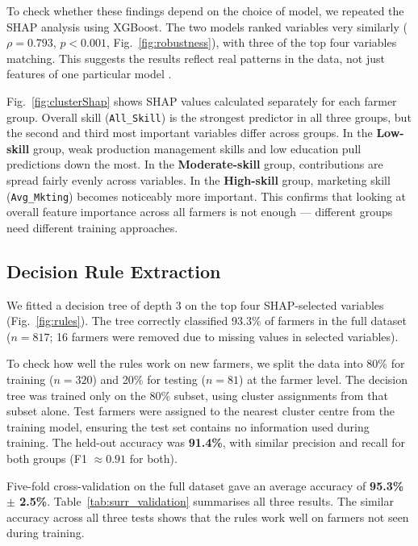 \documentclass[fleqn,10pt,lineno]{wlpeerj}
\begin{document}
To check whether these findings depend on the choice of model, we 
repeated the SHAP analysis using XGBoost. The two models ranked 
variables very similarly ($\rho = 0.793$, $p < 0.001$, 
Fig.~\ref{fig:robustness}), with three of the top four variables 
matching. This suggests the results reflect real patterns in the 
data, not just features of one particular model \citep{lundberg2020}.

Fig.~\ref{fig:clusterShap} shows SHAP values calculated separately 
for each farmer group. Overall skill (\texttt{All\_Skill}) is the 
strongest predictor in all three groups, but the second and third 
most important variables differ across groups. In the 
\textbf{Low-skill} group, weak production management skills and 
low education pull predictions down the most. In the 
\textbf{Moderate-skill} group, contributions are spread fairly 
evenly across variables. In the \textbf{High-skill} group, 
marketing skill (\texttt{Avg\_Mkting}) becomes noticeably more 
important. This confirms that looking at overall feature importance 
across all farmers is not enough — different groups need different 
training approaches.

\subsection{Decision Rule Extraction}

We fitted a decision tree of depth 3 on the top four SHAP-selected 
variables (Fig.~\ref{fig:rules}). The tree correctly classified 
93.3\% of farmers in the full dataset ($n = 817$; 16 farmers were 
removed due to missing values in selected variables).

To check how well the rules work on new farmers, we split the data 
into 80\% for training ($n = 320$) and 20\% for testing ($n = 81$) 
at the farmer level. The decision tree was trained only on the 80\% 
subset, using cluster assignments from that subset alone. Test 
farmers were assigned to the nearest cluster centre from the 
training model, ensuring the test set contains no information used 
during training. The held-out accuracy was \textbf{91.4\%}, with 
similar precision and recall for both groups 
(F1 $\approx 0.91$ for both).

Five-fold cross-validation on the full dataset gave an average 
accuracy of \textbf{95.3\% $\pm$ 2.5\%}. 
Table~\ref{tab:surr_validation} summarises all three results. The 
similar accuracy across all three tests shows that the rules work 
well on farmers not seen during training.
\end{document}
